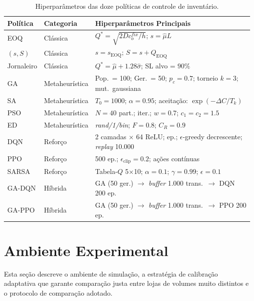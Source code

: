 \documentclass[a4paper,11pt]{article}
\begin{document}
\begin{table}[ht]
\centering
\small
\caption{Hiperparâmetros das doze políticas de controle de
inventário.}
\label{tab:params}
\begin{tabular}{@{}llp{5.5cm}@{}}
\toprule
Política & Categoria & Hiperparâmetros Principais \\
\midrule
EOQ
  & Clássica
  & $Q^* = \sqrt{2Dc_o^{fix}/h}$;\; $s = \hat{\mu}L$ \\
$(s,S)$
  & Clássica
  & $s = s_\text{EOQ}$;\; $S = s + Q_\text{EOQ}$ \\
Jornaleiro
  & Clássica
  & $Q^* = \hat{\mu} + 1.28\hat{\sigma}$;\; SL alvo = $90\%$ \\
\midrule
GA
  & Metaheurística
  & Pop.\ = 100;\; Ger.\ = 50;\; $p_c = 0.7$;\; torneio $k=3$;\; mut.\ gaussiana \\
SA
  & Metaheurística
  & $T_0 = 1000$;\; $\alpha = 0.95$;\; aceitação: $\exp(-\Delta C/T_k)$ \\
PSO
  & Metaheurística
  & $N = 40$ part.;\; 80 iter.;\; $w = 0.7$;\; $c_1 = c_2 = 1.5$ \\
ED
  & Metaheurística
  & \textit{rand/1/bin};\; $F = 0.8$;\; $C_R = 0.9$ \\
\midrule
DQN
  & Reforço
  & 2 camadas $\times$ 64 ReLU;\; 500 ep.;\; $\epsilon$-greedy decrescente;\; \textit{replay} 10.000 \\
PPO
  & Reforço
  & 500 ep.;\; $\epsilon_\text{clip} = 0.2$;\; ações contínuas \\
SARSA
  & Reforço
  & Tabela-$Q$ 5$\times$10;\; $\alpha = 0.1$;\; $\gamma = 0.99$;\; $\epsilon = 0.1$ \\
\midrule
GA-DQN
  & Híbrida
  & GA (50 ger.) $\to$ \textit{buffer} 1.000 trans.\ $\to$ DQN 200 ep. \\
GA-PPO
  & Híbrida
  & GA (50 ger.) $\to$ \textit{buffer} 1.000 trans.\ $\to$ PPO 200 ep. \\
\bottomrule
\end{tabular}
\end{table}

\section{Ambiente Experimental}

Esta seção descreve o ambiente de simulação, a estratégia de
calibração adaptativa que garante comparação justa entre lojas de
volumes muito distintos e o protocolo de comparação adotado.
\end{document}
